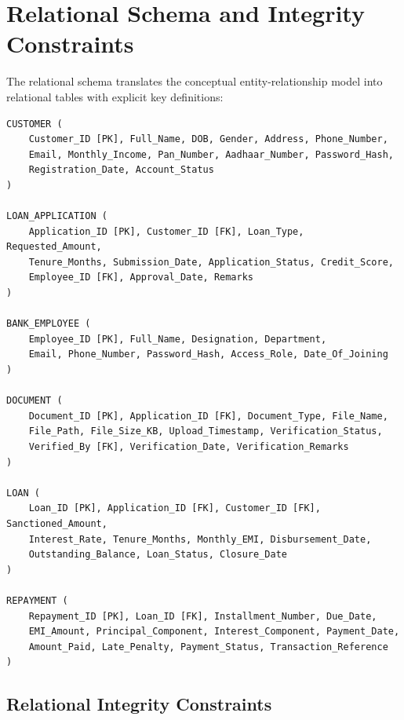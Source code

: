 \documentclass[12pt,a4paper,oneside]{report}
\begin{document}
\section{Relational Schema and Integrity Constraints}

The relational schema translates the conceptual entity-relationship model into relational tables with explicit key definitions:

\begin{lstlisting}
CUSTOMER (
    Customer_ID [PK], Full_Name, DOB, Gender, Address, Phone_Number, 
    Email, Monthly_Income, Pan_Number, Aadhaar_Number, Password_Hash, 
    Registration_Date, Account_Status
)

LOAN_APPLICATION (
    Application_ID [PK], Customer_ID [FK], Loan_Type, Requested_Amount, 
    Tenure_Months, Submission_Date, Application_Status, Credit_Score, 
    Employee_ID [FK], Approval_Date, Remarks
)

BANK_EMPLOYEE (
    Employee_ID [PK], Full_Name, Designation, Department, 
    Email, Phone_Number, Password_Hash, Access_Role, Date_Of_Joining
)

DOCUMENT (
    Document_ID [PK], Application_ID [FK], Document_Type, File_Name, 
    File_Path, File_Size_KB, Upload_Timestamp, Verification_Status, 
    Verified_By [FK], Verification_Date, Verification_Remarks
)

LOAN (
    Loan_ID [PK], Application_ID [FK], Customer_ID [FK], Sanctioned_Amount, 
    Interest_Rate, Tenure_Months, Monthly_EMI, Disbursement_Date, 
    Outstanding_Balance, Loan_Status, Closure_Date
)

REPAYMENT (
    Repayment_ID [PK], Loan_ID [FK], Installment_Number, Due_Date, 
    EMI_Amount, Principal_Component, Interest_Component, Payment_Date, 
    Amount_Paid, Late_Penalty, Payment_Status, Transaction_Reference
)
\end{lstlisting}

\subsection{Relational Integrity Constraints}
\end{document}
